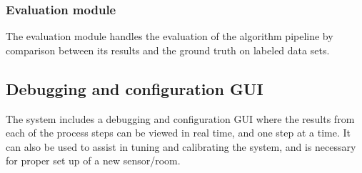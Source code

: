 \subsubsection{Evaluation module}
The evaluation module handles the evaluation of the algorithm pipeline by comparison between its results and the ground truth on labeled data sets.  

\subsection{Debugging and configuration GUI}
The system includes a debugging and configuration GUI where the results from each of the process steps can be viewed in real time, and one step at a time. It can also be used to assist in tuning and calibrating the system, and is necessary for proper set up of a new sensor/room. 
